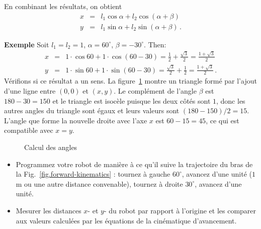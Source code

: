 En combinant les résultats, on obtient
\begin{eqnarray*}
x &=& l_1 \cos \alpha + l_2 \cos(\alpha + \beta)\\
y &=& l_1 \sin \alpha + l_2 \sin(\alpha + \beta)\,.
\end{eqnarray*}

\noindent\textbf{Exemple} Soit $l_1 = l_2 = 1$, $\alpha = 60^{\circ}$, $\beta = -30^{\circ}$. Then:
\begin{eqnarray*}
x &=& 1\cdot\cos 60 + 1\cdot\cos(60-30) = \frac{1}{2} + \frac{\sqrt{3}}{2} = \frac{1+\sqrt{3}}{2}\\
y &=& 1\cdot\sin 60 + 1\cdot\sin(60-30) = \frac{\sqrt{3}}{2} + \frac{1}{2} = \frac{1+\sqrt{3}}{2}\,.
\end{eqnarray*}
Vérifions si ce résultat a un sens. La figure~\ref{fig.kinematics-triangle} montre un triangle formé par l'ajout d'une ligne entre $(0,0)$ et $(x,y)$. Le complément de l'angle $\beta$ est $180-30=150$ et le triangle est isocèle puisque les deux côtés sont $1$, donc les autres angles du triangle sont égaux et leurs valeurs sont $(180-150)/2=15$. L'angle que forme la nouvelle droite avec l'axe $x$ est $60-15=45$, ce qui est compatible avec $x=y$.

\begin{figure}
\begin{center}
\end{center}
\caption{Calcul des angles}\label{fig.kinematics-triangle}
\end{figure}

\begin{framed}
\begin{itemize}
\item Programmez votre robot de manière à ce qu'il suive la trajectoire du bras de la Fig.~\ref{fig.forward-kinematics} : tournez à gauche $60^{\circ}$, avancez d'une unité ($1$m ou une autre distance convenable), tournez à droite $30^{\circ}$, avancez d'une unité.
\item Mesurer les distances $x$- et $y$- du robot par rapport à l'origine et les comparer aux valeurs calculées par les équations de la cinématique d'avancement.
\end{itemize}
\end{framed}

